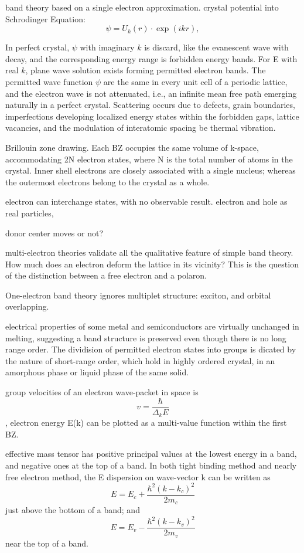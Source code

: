 band theory based on a single electron approximation. crystal potential into Schrodinger Equation:
\[
\psi = U_k(r)\cdot\exp(ikr),
\]

In perfect crystal, $\psi$ with imaginary $k$ is discard, like the evanescent wave with decay, and the corresponding energy range is forbidden energy bands. For E with real $k$, plane wave solution exists forming permitted electron bands. The permitted wave function $\psi$ are the same in every unit cell of a periodic lattice, and the electron wave is not attenuated, i.e., an infinite mean free path emerging naturally in a perfect crystal. Scattering occurs due to defects, grain boundaries, imperfections developing localized energy states within the forbidden gaps, lattice vacancies, and the modulation of interatomic spacing be thermal vibration. 

Brillouin zone drawing. Each BZ occupies the same volume of k-space, accommodating 2N electron states, where N is the total number of atoms in the crystal. Inner shell electrons are closely associated with a single nucleus; whereas the outermost electrons belong to the crystal as a whole. 

electron can interchange states, with no observable result. electron and hole as real particles, 

donor center moves or not? 

multi-electron theories validate all the qualitative feature of simple band theory. How much does an electron deform the lattice in its vicinity? This is the question of the distinction between a free electron and a polaron. 

One-electron band theory ignores multiplet structure: exciton, and orbital overlapping. 

electrical properties of some metal and semiconductors are virtually unchanged in melting, suggesting a band structure is preserved even though there is no long range order. The dividision of permitted electron states into groups is dicated by the nature of short-range order, which hold in highly ordered crystal, in an amorphous phase or liquid phase of the same solid. 

group velocities of an electron wave-packet in space is 
\[
v = \frac{\hbar}{\Delta_k E}
\]
, electron energy E(k) can be plotted as a multi-value function within the first BZ. 

effective mass tensor has positive principal values at the lowest energy in a band, and negative ones at the top of a band. In both tight binding method and nearly free electron method, the E dispersion on wave-vector k can be written as 
\[
E = E_c + \frac{\hbar^2(k-k_c)^2}{2m_c}
\]
just above the bottom of a band; and 
\[
E = E_v - \frac{\hbar^2(k-k_v)^2}{2m_v}
\]
near the top of a band. 

